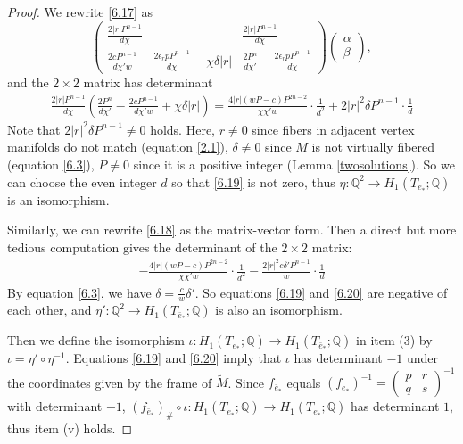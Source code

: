\documentclass{amsart}
\numberwithin{equation}{section}
\theoremstyle{definition}
\begin{document}
\begin{proof}
We rewrite \eqref{6.17} as 
$$
\begin{pmatrix}
\frac{2|r|P^{n-1}}{d\chi} & \frac{2|r|P^{n-1}}{d\chi}\\
\frac{2cP^{n-1}}{d\chi'w}-\frac{2\epsilon_r pP^{n-1}}{d\chi}-\chi\delta|r| & \frac{2P^n}{d\chi'}-\frac{2\epsilon_rpP^ {n-1}}{d\chi}
\end{pmatrix}
\begin{pmatrix}
\alpha \\
\beta
\end{pmatrix},
$$
and the $2\times 2$ matrix has determinant 
\begin{align}\label{6.19}
\frac{2|r|P^{n-1}}{d\chi}(\frac{2P^n}{d\chi'}-\frac{2cP^{n-1}}{d\chi'w}+\chi\delta|r|)=\frac{4|r|(wP-c)P^{2n-2}}{\chi\chi'w}\cdot \frac{1}{d^2}+2|r|^2\delta P^{n-1}\cdot \frac{1}{d}
\end{align}
Note that $2|r|^2\delta P^{n-1}\ne 0$ holds. Here, $r\ne 0$ since fibers in adjacent vertex manifolds do not match (equation \eqref{2.1}), $\delta\ne 0$ since $M$ is not virtually fibered (equation \eqref{6.3}), $P\ne 0$ since it is a positive integer (Lemma \ref{twosolutions}). So we can choose the even integer $d$ so that \eqref{6.19} is not zero, thus $\eta:\mathbb{Q}^2\to H_1(T_{e_*};\mathbb{Q})$ is an isomorphism.

Similarly, we can rewrite \eqref{6.18} as the matrix-vector form. Then a direct but more tedious computation gives the determinant of the $2\times 2$ matrix:
\begin{align}\label{6.20}
-\frac{4|r|(wP-c)P^{2n-2}}{\chi\chi'w}\cdot \frac{1}{d^2}-\frac{2|r|^2c \delta' P^{n-1}}{w}\cdot \frac{1}{d}
\end{align}
By equation \eqref{6.3}, we have $\delta=\frac{c}{w}\delta'$. So equations \eqref{6.19} and \eqref{6.20} are negative of each other, and $\eta':\mathbb{Q}^2\to H_1(T_{\bar{e}_*};\mathbb{Q})$ is also an isomorphism.

Then we define the isomorphism $\iota:H_1(T_{e_*};\mathbb{Q})\to H_1(T_{\bar{e}_*};\mathbb{Q})$ in item (3) by $\iota=\eta'\circ \eta^{-1}$. Equations \eqref{6.19} and \eqref{6.20} imply that $\iota$ has determinant $-1$ under the coordinates given by the frame of $\tilde{M}$. Since $f_{\bar{e}_*}$ equals
$(f_{e_*})^{-1}=\begin{pmatrix}
p & r \\
q & s
\end{pmatrix}^{-1}$ with determinant $-1$, $(f_{\bar{e}_*})_{\#}\circ \iota: H_1(T_{e_*};\mathbb{Q})\to H_1(T_{e_*};\mathbb{Q})$ has determinant $1$, thus item (v) holds.


\end{proof}
\end{document}
